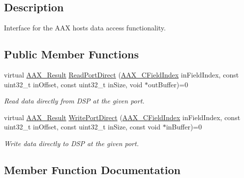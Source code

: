 \subsection{Description}
Interface for the A\+A\+X host\textquotesingle{}s data access functionality. \subsection*{Public Member Functions}
\begin{DoxyCompactItemize}
\item 
virtual \hyperlink{a00149_a4d8f69a697df7f70c3a8e9b8ee130d2f}{A\+A\+X\+\_\+\+Result} \hyperlink{a00078_ac722af5542e8e2dd4a52c6ef621ed034}{Read\+Port\+Direct} (\hyperlink{a00149_ae807f8986143820cfb5d6da32165c9c7}{A\+A\+X\+\_\+\+C\+Field\+Index} in\+Field\+Index, const uint32\+\_\+t in\+Offset, const uint32\+\_\+t in\+Size, void $\ast$out\+Buffer)=0
\begin{DoxyCompactList}\small\item\em Read data directly from D\+S\+P at the given port. \end{DoxyCompactList}\item 
virtual \hyperlink{a00149_a4d8f69a697df7f70c3a8e9b8ee130d2f}{A\+A\+X\+\_\+\+Result} \hyperlink{a00078_adce9d27f8faacffeed2dc1ec28561bfc}{Write\+Port\+Direct} (\hyperlink{a00149_ae807f8986143820cfb5d6da32165c9c7}{A\+A\+X\+\_\+\+C\+Field\+Index} in\+Field\+Index, const uint32\+\_\+t in\+Offset, const uint32\+\_\+t in\+Size, const void $\ast$in\+Buffer)=0
\begin{DoxyCompactList}\small\item\em Write data directly to D\+S\+P at the given port. \end{DoxyCompactList}\end{DoxyCompactItemize}


\subsection{Member Function Documentation}
\hypertarget{a00078_ac722af5542e8e2dd4a52c6ef621ed034}{}
